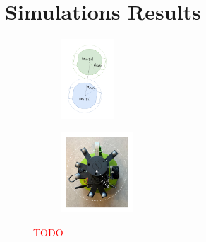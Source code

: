 \documentclass{ifacconf}
\begin{document}
\section{Simulations Results}
\label{sec:simulation_results}
\begin{figure}
    \centering
    \begin{subfigure}{0.3\columnwidth}
        \includegraphics[height=3cm]{images/dSafe.pdf}
    \end{subfigure}
    \hspace{-0.6cm}
    \begin{subfigure}{0.3\columnwidth}
        \includegraphics[height=3cm]{images/robot_dSafe.pdf}
    \end{subfigure}
    \caption{\textcolor{red}{TODO}}
    \label{fig:safety_distance}
\end{figure}
\end{document}
